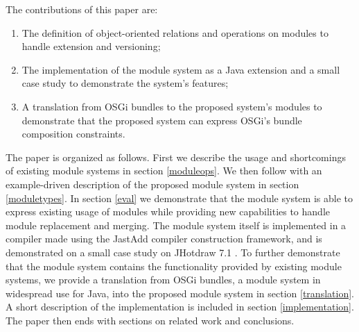 




%

The contributions of this paper are:

\begin{enumerate}
\item  The definition of object-oriented relations and operations on modules to 
handle extension and versioning;
\item The implementation of the module system as a Java extension and a
small case study to demonstrate the system's features;
\item A translation from OSGi bundles to the proposed system's modules to
demonstrate that the proposed system can express OSGi's bundle composition constraints.
\end{enumerate}

The paper is organized as follows. First we describe the
usage and shortcomings of existing module systems in section \ref{moduleops}. 
We then follow with an example-driven description of the proposed module system in section \ref{moduletypes}. 
In section \ref{eval} we demonstrate that the module
system is able to express existing usage of modules while providing new
capabilities to handle module replacement and merging. The module system
itself is implemented in a compiler made using the JastAdd\cite{jastadd} compiler construction
framework, and is demonstrated on a small case study on JHotdraw 7.1 \cite{jhotdraw}.
To further demonstrate that the module system contains the functionality provided by existing
module systems, we provide a translation from OSGi bundles, a module system in widespread
use for Java, into the proposed module system in section \ref{translation}.
A short description of the implementation is included in section \ref{implementation}.
The paper then ends with sections on related work and conclusions.
